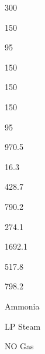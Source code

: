 \documentclass[a4paper,portrait,12pt]{article}
\begin{document}
300





150





95





150





150





150





95





970.5





16.3





428.7





790.2





274.1





1692.1





517.8





798.2





\begin{flushleft}
Ammonia
\end{flushleft}





\begin{flushleft}
LP Steam
\end{flushleft}





\begin{flushleft}
NO Gas
\end{flushleft}
\end{document}
